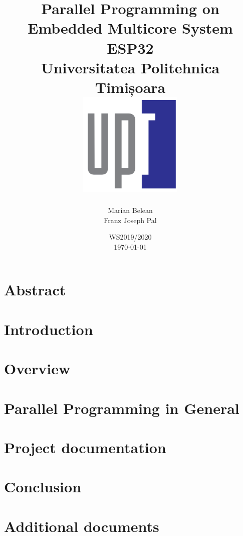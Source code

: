 \documentclass[12pt, twoside]{report}
\title{
	{Parallel Programming on Embedded Multicore System ESP32\bigskip}\\
	{\large Universitatea Politehnica Timișoara\bigskip\bigskip}\\
	{\includegraphics[width=50mm,scale=0.5]{upt_logo.png}}
}
\author{ Marian Belean\\ Franz Joseph Pal }
\date{ WS2019/2020 \\ \today}
\begin{document}
\maketitle


\chapter*{Abstract}




\tableofcontents

\chapter{Introduction}\label{chap:introduction}



\chapter{Overview}\label{chap:overview}


\chapter{Parallel Programming in General}\label{chap:parallelprg}


\chapter{Project documentation}\label{chap:documentation}


\chapter{Conclusion}\label{chap:conclusion}


\appendix
\chapter{Additional documents}


\printbibliography
\nocite{*}
\end{document}
